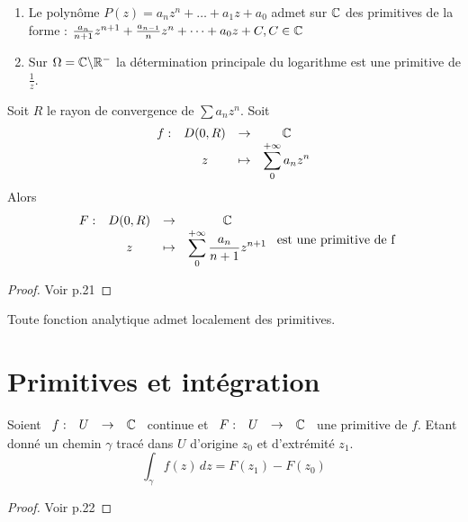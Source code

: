 \documentclass[]{report}
\begin{document}
\begin{ex}
    \begin{enumerate}
        \item Le polynôme $P(z)=a_nz^n+\dots+a_1z+a_0$ admet sur $\mathbb{C}$ des primitives de la forme : $\frac{a_n}{n+1}z^{n+1}+\frac{a_{n-1}}{n}z^n+\dots+a_0z+C,C\in\mathbb{C}$
        \item Sur $\Omega=\mathbb{C}\backslash\mathbb{R}^-$ la détermination principale du logarithme est une primitive de $\frac{1}{z}$.
    \end{enumerate}
\end{ex}

\begin{prop}
    Soit $R$ le rayon de convergence de $\sum a_nz^n$. Soit $$\begin{array}{ccccc}
f : & D(0,R) & \to & \mathbb{C} \\
  & z & \mapsto &  \displaystyle{\sum_0^{+\infty}a_nz^n} \end{array}$$
Alors $$\begin{array}{ccccc}
F : & D(0,R) & \to & \mathbb{C} \\
  & z & \mapsto & \displaystyle{\sum_0^{+\infty}\frac{a_n}{n+1}z^{n+1}}  
\end{array}\text{ est une primitive de f}$$
\end{prop}

\begin{proof}
    Voir p.21
\end{proof}

\begin{cor}
    Toute fonction analytique admet localement des primitives.
\end{cor}

\section*{Primitives et intégration}

\begin{prop}
    Soient $\begin{array}{ccccc}
f : & U & \to & \mathbb{C}
\end{array}$ continue et $\begin{array}{ccccc}
F : & U & \to & \mathbb{C}
\end{array}$ une primitive de $f$. Etant donné un chemin $\gamma$ tracé dans $U$ d'origine $z_0$ et d'extrémité $z_1$.$$\int_\gamma f(z)\,dz=F(z_1)-F(z_0)$$
\end{prop}

\begin{proof}
    Voir p.22
\end{proof}
\end{document}
